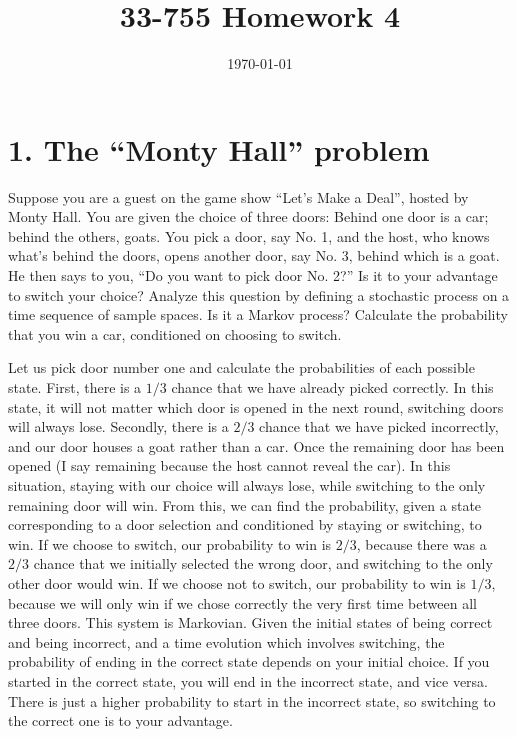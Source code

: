 \documentclass[a4paper,twoside]{article}
\title{33-755 Homework 4}
\date{\today}
\begin{document}
\maketitle

\section*{1. The ``Monty Hall'' problem}
Suppose you are a guest on the game show “Let’s Make a Deal”, hosted by Monty Hall. You are given the choice of three doors: Behind one door is a car; behind the others, goats. You pick a door, say No. 1, and the host, who knows what’s behind the doors, opens another door, say No. 3, behind which is a goat. He then says to you, “Do you want to pick door No. 2?” Is it to your advantage to switch your choice? Analyze this question by defining a stochastic process on a time sequence of sample spaces. Is it a Markov process? Calculate the probability that you win a car, conditioned on choosing to switch.

\begin{tcolorbox}[breakable]
    Let us pick door number one and calculate the probabilities of each possible state.
    First, there is a $ 1/3 $ chance that we have already picked correctly. In this state, it will not matter which door is opened in the next round, switching doors will always lose.
    Secondly, there is a $ 2/3 $ chance that we have picked incorrectly, and our door houses a goat rather than a car. Once the remaining door has been opened (I say remaining because the host cannot reveal the car). In this situation, staying with our choice will always lose, while switching to the only remaining door will win.
    From this, we can find the probability, given a state corresponding to a door selection and conditioned by staying or switching, to win. If we choose to switch, our probability to win is $ 2/3 $, because there was a $ 2/3 $ chance that we initially selected the wrong door, and switching to the only other door would win. If we choose not to switch, our probability to win is $ 1/3 $, because we will only win if we chose correctly the very first time between all three doors.
    This system is Markovian. Given the initial states of being correct and being incorrect, and a time evolution which involves switching, the probability of ending in the correct state depends on your initial choice. If you started in the correct state, you will end in the incorrect state, and vice versa. There is just a higher probability to start in the incorrect state, so switching to the correct one is to your advantage.
\end{tcolorbox}
\end{document}
